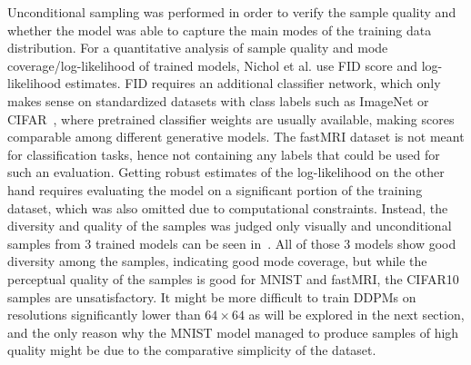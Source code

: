 Unconditional sampling was performed in order to verify the sample quality and whether the model was able to capture the main modes of the training data distribution. For a quantitative analysis of sample quality and mode coverage/log-likelihood of trained models, Nichol et al. use FID score and log-likelihood estimates. FID requires an additional classifier network, which only makes sense on standardized datasets with class labels such as ImageNet or CIFAR~\autocite{imagenet, cifar}, where pretrained classifier weights are usually available, making scores comparable among different generative models. The fastMRI dataset is not meant for classification tasks, hence not containing any labels that could be used for such an evaluation. Getting robust estimates of the log-likelihood on the other hand requires evaluating the model on a significant portion of the training dataset, which was also omitted due to computational constraints. Instead, the diversity and quality of the samples was judged only visually and unconditional samples from 3 trained models can be seen in~. All of those 3 models show good diversity among the samples, indicating good mode coverage, but while the perceptual quality of the samples is good for MNIST and fastMRI, the CIFAR10 samples are unsatisfactory. It might be more difficult to train DDPMs on resolutions significantly lower than $64\times 64$ as will be explored in the next section, and the only reason why the MNIST model managed to produce samples of high quality might be due to the comparative simplicity of the dataset.

